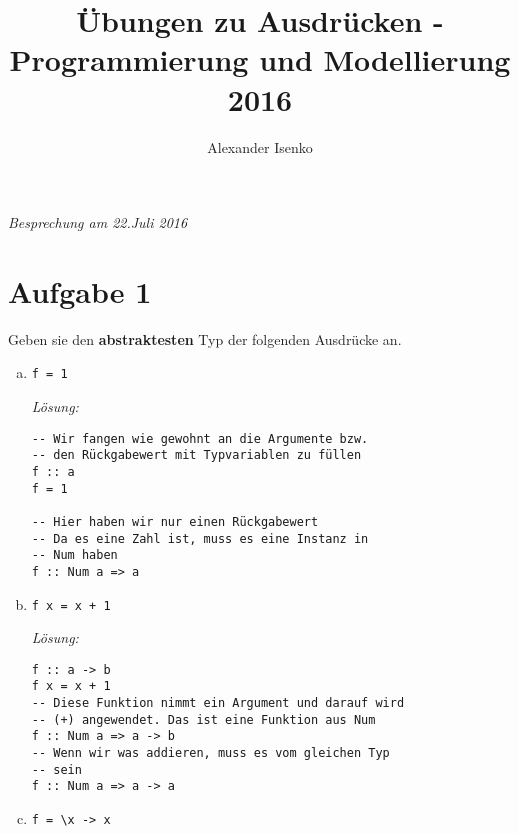 \documentclass{article}
\title{Übungen zu Ausdrücken - Programmierung und Modellierung 2016}
\author{Alexander Isenko}
\begin{document}
\maketitle

\begin{center}
\textit{Besprechung am 22.Juli 2016}
\end{center}

\section*{Aufgabe 1}
Geben sie den \textbf{abstraktesten} Typ der folgenden Ausdrücke an. 
\begin{enumerate} [a)]
    \item \begin{verbatim}
f = 1
          \end{verbatim}

    \textit{Lösung:}
    \begin{mdframed}[backgroundcolor=bg]
        \begin{verbatim}
-- Wir fangen wie gewohnt an die Argumente bzw.
-- den Rückgabewert mit Typvariablen zu füllen
f :: a
f = 1

-- Hier haben wir nur einen Rückgabewert
-- Da es eine Zahl ist, muss es eine Instanz in
-- Num haben
f :: Num a => a
        \end{verbatim}
    \end{mdframed}

    \item \begin{verbatim}
f x = x + 1
          \end{verbatim}

    \textit{Lösung:}
    \begin{mdframed}[backgroundcolor=bg]
        \begin{verbatim}
f :: a -> b
f x = x + 1
-- Diese Funktion nimmt ein Argument und darauf wird
-- (+) angewendet. Das ist eine Funktion aus Num
f :: Num a => a -> b
-- Wenn wir was addieren, muss es vom gleichen Typ
-- sein
f :: Num a => a -> a
        \end{verbatim}
    \end{mdframed}

\newpage

    \item \begin{verbatim}
f = \x -> x
          \end{verbatim}


\end{enumerate}
\end{document}
